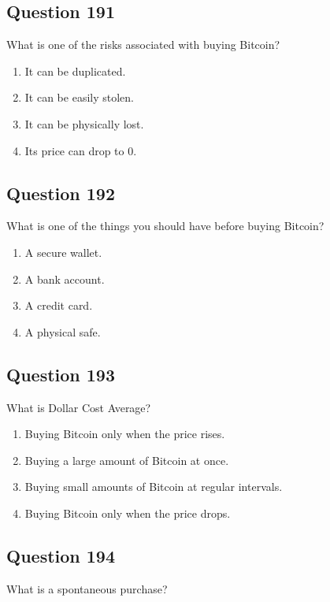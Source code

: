 \documentclass[12pt,a4paper]{article}
\begin{document}
\bigskip


\subsection*{Question 191}
What is one of the risks associated with buying Bitcoin?

\begin{enumerate}[label=\Alph*., leftmargin=*]
\item It can be duplicated.
\item It can be easily stolen.
\item It can be physically lost.
\item Its price can drop to 0.
\end{enumerate}

\bigskip


\subsection*{Question 192}
What is one of the things you should have before buying Bitcoin?

\begin{enumerate}[label=\Alph*., leftmargin=*]
\item A secure wallet.
\item A bank account.
\item A credit card.
\item A physical safe.
\end{enumerate}

\bigskip


\subsection*{Question 193}
What is Dollar Cost Average?

\begin{enumerate}[label=\Alph*., leftmargin=*]
\item Buying Bitcoin only when the price rises.
\item Buying a large amount of Bitcoin at once.
\item Buying small amounts of Bitcoin at regular intervals.
\item Buying Bitcoin only when the price drops.
\end{enumerate}

\bigskip


\subsection*{Question 194}
What is a spontaneous purchase?
\end{document}
